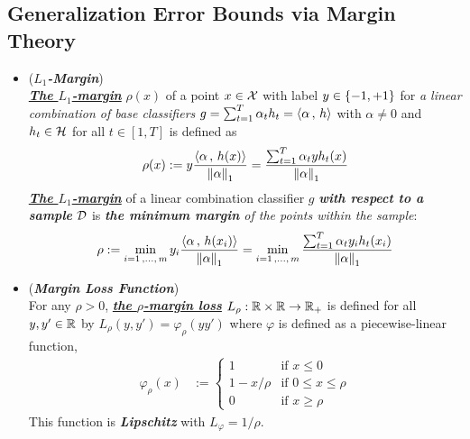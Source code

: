 \documentclass[11pt]{article}
\begin{document}
\subsection{Generalization Error Bounds via  Margin Theory}
\begin{itemize}

\item \begin{definition} (\textbf{\emph{$L_1$-Margin}}) \citep{mohri2018foundations, schapire2012boosting}\\
\underline{\emph{\textbf{The $L_1$-margin}}} $\rho(x)$ of a point $x \in {\mathcal X}$ with label $y \in \left\{-1, +1\right\}$ for \emph{a linear combination of base classifiers} $g = \sum_{t=1}^{T}\alpha_t h_t = \left\langle \alpha\,,\, h \right\rangle$ with $\alpha \neq 0$ and $h_t \in {\mathcal H}$ for all $t \in [1, T]$ is defined as
\begin{align}
\rho(x) := y \frac{\left\langle \alpha\,,\, h(x) \right\rangle}{\left\|\alpha\right\|_{1}} =  \frac{\sum_{t=1}^{T}\alpha_t y h_t(x)}{\left\|\alpha\right\|_{1}} \label{def: l1_margin}
\end{align} \underline{\emph{\textbf{The $L_1$-margin}}} of a linear combination classifier $g$ \emph{\textbf{with respect to a sample}} ${\mathcal D}$ is \emph{\textbf{the minimum margin} of the points within the sample}:
\begin{align}
\rho := \min_{i=1\,{,}\ldots{,}\, m}y_i \frac{\left\langle \alpha\,,\, h(x_i) \right\rangle}{\left\|\alpha\right\|_{1}} = \min_{i=1\,{,}\ldots{,}\, m} \frac{\sum_{t=1}^{T}\alpha_t y_i  h_t(x_i)}{\left\|\alpha\right\|_{1}} \label{def: l1_margin_sample}
\end{align}
\end{definition}

\item \begin{definition}(\textbf{\emph{Margin Loss Function}})  \citep{mohri2018foundations, schapire2012boosting}\\
For any $\rho > 0$,  \underline{\emph{\textbf{the $\rho$-margin loss}}} $L_{\rho}: {\mathbb R} \times {\mathbb R} \to {\mathbb R}_{+}$ is defined for all $y, y' \in {\mathbb R}$ by  $L_{\rho}(y,y') = \varphi_{\rho}(yy')$ where $\varphi$ is defined as a piecewise-linear function,
\begin{align*}
\varphi_{\rho}(x) &:= \left\{ \begin{array}{cc}
1 &\text{if } x\le 0\\
1 - x/\rho &\text{if } 0 \le x \le \rho\\
0 &\text{if } x \ge \rho
\end{array}
\right.
\end{align*} This function is \textbf{\emph{Lipschitz}} with $L_{\varphi} = 1/\rho$.
\end{definition}


\end{itemize}
\end{document}
